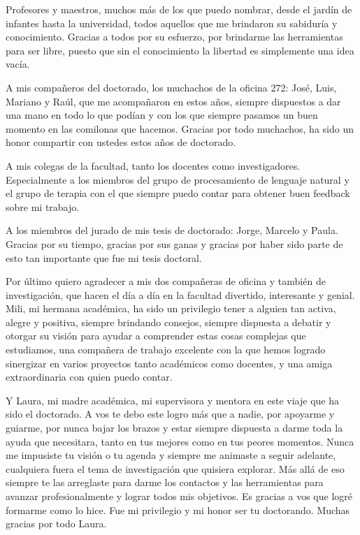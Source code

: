 \documentclass[
11pt, %
english, %
onehalfspacing, %
nolistspacing, %
headsepline, %
consistentlayout, %
]{MastersDoctoralThesis} %
\begin{document}
\begin{acknowledgements}
  Profesores y maestros, muchos más de los que puedo nombrar, desde el jardín
  de infantes hasta la universidad, todos aquellos que me brindaron su
  sabiduría y conocimiento. Gracias a todos por su esfuerzo, por brindarme las
  herramientas para ser libre, puesto que sin el conocimiento la libertad es
  simplemente una idea vacía.

  A mis compañeros del doctorado, los muchachos de la oficina 272: José, Luis,
  Mariano y Raúl, que me acompañaron en estos años, siempre dispuestos a dar
  una mano en todo lo que podían y con los que siempre pasamos un buen momento
  en las comilonas que hacemos. Gracias por todo muchachos, ha sido un honor
  compartir con ustedes estos años de doctorado.

  A mis colegas de la facultad, tanto los docentes como investigadores.
  Especialmente a los miembros del grupo de procesamiento de lenguaje natural y
  el grupo de terapia con el que siempre puedo contar para obtener buen
  feedback sobre mi trabajo.

  A los miembros del jurado de mis tesis de doctorado: Jorge, Marcelo y Paula.
  Gracias por su tiempo, gracias por sus ganas y gracias por haber sido parte
  de esto tan importante que fue mi tesis doctoral.

  Por último quiero agradecer a mis dos compañeras de oficina y también de
  investigación, que hacen el día a día en la facultad divertido, interesante y
  genial. Mili, mi hermana académica, ha sido un privilegio tener a alguien tan
  activa, alegre y positiva, siempre brindando consejos, siempre dispuesta a
  debatir y otorgar su visión para ayudar a comprender estas cosas complejas
  que estudiamos, una compañera de trabajo excelente con la que hemos logrado
  sinergizar en varios proyectos tanto académicos como docentes, y una amiga
  extraordinaria con quien puedo contar.

  Y Laura, mi madre académica, mi supervisora y mentora en este viaje que ha
  sido el doctorado. A vos te debo este logro más que a nadie, por apoyarme y
  guiarme, por nunca bajar los brazos y estar siempre dispuesta a darme toda la
  ayuda que necesitara, tanto en tus mejores como en tus peores momentos. Nunca
  me impusiste tu visión o tu agenda y siempre me animaste a seguir adelante,
  cualquiera fuera el tema de investigación que quisiera explorar. Más allá de
  eso siempre te las arreglaste para darme los contactos y las herramientas
  para avanzar profesionalmente y lograr todos mis objetivos. Es gracias a vos
  que logré formarme como lo hice. Fue mi privilegio y mi honor ser tu
  doctorando. Muchas gracias por todo Laura.

\end{acknowledgements}
\end{document}
